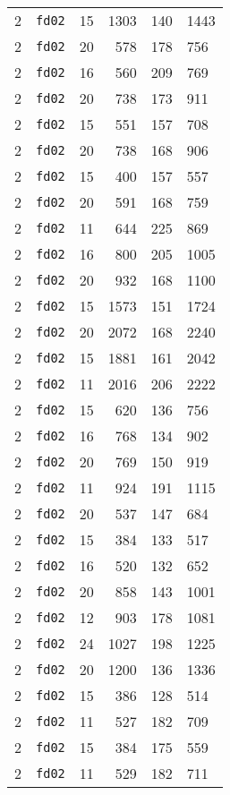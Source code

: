 \documentclass{article}
\begin{document}
\begin{table}[h!]
\begin{tabular}{llrrrl}
    2 & \texttt{fd02} & 15 & 1303 & 140 & 1443 \\
    2 & \texttt{fd02} & 20 & 578 & 178 & 756 \\
    2 & \texttt{fd02} & 16 & 560 & 209 & 769 \\
    2 & \texttt{fd02} & 20 & 738 & 173 & 911 \\
    2 & \texttt{fd02} & 15 & 551 & 157 & 708 \\
    2 & \texttt{fd02} & 20 & 738 & 168 & 906 \\
    2 & \texttt{fd02} & 15 & 400 & 157 & 557 \\
    2 & \texttt{fd02} & 20 & 591 & 168 & 759 \\
    2 & \texttt{fd02} & 11 & 644 & 225 & 869 \\
    2 & \texttt{fd02} & 16 & 800 & 205 & 1005 \\
    2 & \texttt{fd02} & 20 & 932 & 168 & 1100 \\
    2 & \texttt{fd02} & 15 & 1573 & 151 & 1724 \\
    2 & \texttt{fd02} & 20 & 2072 & 168 & 2240 \\
    2 & \texttt{fd02} & 15 & 1881 & 161 & 2042 \\
    2 & \texttt{fd02} & 11 & 2016 & 206 & 2222 \\
    2 & \texttt{fd02} & 15 & 620 & 136 & 756 \\
    2 & \texttt{fd02} & 16 & 768 & 134 & 902 \\
    2 & \texttt{fd02} & 20 & 769 & 150 & 919 \\
    2 & \texttt{fd02} & 11 & 924 & 191 & 1115 \\
    2 & \texttt{fd02} & 20 & 537 & 147 & 684 \\
    2 & \texttt{fd02} & 15 & 384 & 133 & 517 \\
    2 & \texttt{fd02} & 16 & 520 & 132 & 652 \\
    2 & \texttt{fd02} & 20 & 858 & 143 & 1001 \\
    2 & \texttt{fd02} & 12 & 903 & 178 & 1081 \\
    2 & \texttt{fd02} & 24 & 1027 & 198 & 1225 \\
    2 & \texttt{fd02} & 20 & 1200 & 136 & 1336 \\
    2 & \texttt{fd02} & 15 & 386 & 128 & 514 \\
    2 & \texttt{fd02} & 11 & 527 & 182 & 709 \\
    2 & \texttt{fd02} & 15 & 384 & 175 & 559 \\
    2 & \texttt{fd02} & 11 & 529 & 182 & 711 \\

\end{tabular}
\end{table}
\end{document}
